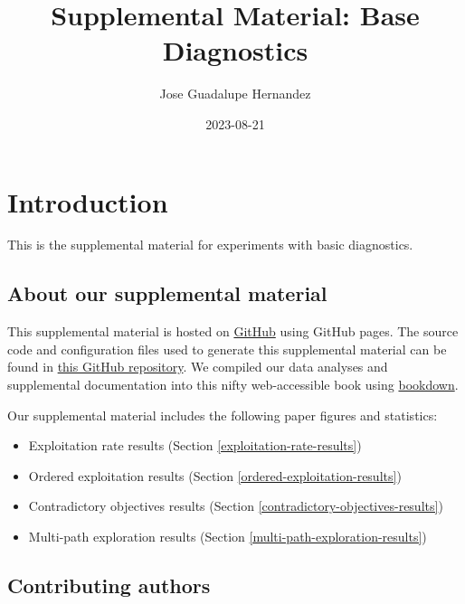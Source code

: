 \documentclass[]{book}
\title{Supplemental Material: Base Diagnostics}
\author{Jose Guadalupe Hernandez}
\date{2023-08-21}
\providecommand{\tightlist}{%
  \setlength{\itemsep}{0pt}\setlength{\parskip}{0pt}}
\begin{document}
\maketitle

{
\setcounter{tocdepth}{1}
\tableofcontents
}
\hypertarget{introduction}{%
\chapter{Introduction}\label{introduction}}

This is the supplemental material for experiments with basic diagnostics.

\hypertarget{about-our-supplemental-material}{%
\section{About our supplemental material}\label{about-our-supplemental-material}}

This supplemental material is hosted on \href{https://github.com}{GitHub} using GitHub pages.
The source code and configuration files used to generate this supplemental material can be found in \href{https://github.com/jgh9094/ECJ-2023-Suite-Of-Diagnostic-Metrics-For-Characterizing-Selection-Schemes}{this GitHub repository}.
We compiled our data analyses and supplemental documentation into this nifty web-accessible book using \href{https://bookdown.org/}{bookdown}.

Our supplemental material includes the following paper figures and statistics:

\begin{itemize}
\tightlist
\item
  Exploitation rate results (Section \ref{exploitation-rate-results})
\item
  Ordered exploitation results (Section \ref{ordered-exploitation-results})
\item
  Contradictory objectives results (Section \ref{contradictory-objectives-results})
\item
  Multi-path exploration results (Section \ref{multi-path-exploration-results})
\end{itemize}

\hypertarget{contributing-authors}{%
\section{Contributing authors}\label{contributing-authors}}

\begin{itemize}
\tightlist
\item
  \href{https://jgh9094.github.io/}{Jose Guadalupe Hernandez}
\item
  \href{https://lalejini.com}{Alexander Lalejini}
\item
  \href{http://ofria.com}{Charles Ofria}
\end{itemize}
\end{document}
